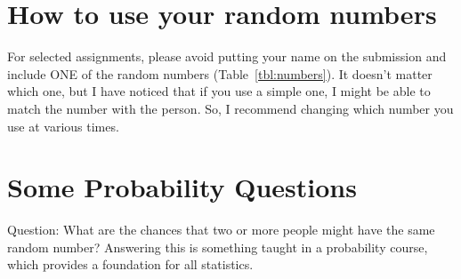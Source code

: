 \documentclass{article}\usepackage[]{graphicx}\usepackage[]{xcolor}
\begin{document}
\begin{table}[ht]
\centering
\caption{Random Numbers for EA30, Fall 2025} 
\label{tbl:numbers}
\end{table}


\section*{How to use your random numbers}

For selected assignments, please avoid putting your name on the submission and include ONE of the random numbers (Table~\ref{tbl:numbers}). It doesn't matter which one, but I have noticed that if you use a simple one, I might be able to match the number with the person. So, I recommend changing which number you use at various times.

\section*{Some Probability Questions}

Question: What are the chances that two or more people might have the same random number?  Answering this is something taught in a probability course, which provides a foundation for all statistics.
\end{document}
